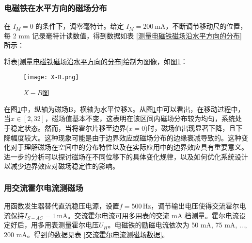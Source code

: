 \documentclass[11pt]{article}
\begin{document}
	
	\subsubsection{电磁铁在水平方向的磁场分布}
	
	在 $I_M = 0$ 的条件下，调零毫特计。给定 $I_M = 200 \ \mathrm{mA}$，不断调节移动尺的位置，每 2 mm 记录毫特计读数值，得到数据如表 \ref{测量电磁铁磁场沿水平方向的分布} 所示：
	\begin{table}[H]\centering
		\caption{测量电磁铁磁场沿水平方向的分布}
		\label{测量电磁铁磁场沿水平方向的分布}
	\end{table}
	
	将表\ref{测量电磁铁磁场沿水平方向的分布}绘制为图像，如图\ref{fig:X-B}：
	\begin{figure}[H]
		\centering
		\texttt{[image: X-B.png]}
		\caption{$X-B$图}
		\label{fig:X-B}
	\end{figure}
	
	在图\ref{fig:X-B}中，纵轴为磁场B，横轴为水平位移X。从图\ref{fig:X-B}中可以看出，在移动过程中，当$x \in [2, 32]$，磁场值基本不变，这表明在该区间内磁场分布较为均匀，系统处于稳定状态。然而，当将霍尔片移至边界($x=0$)时，磁场值出现显著下降，且下降幅度较大。这种现象可能是由于边界效应或磁场分布的边缘衰减导致的。这种变化对于理解磁场在空间中的分布特性以及在实际应用中的边界效应具有重要意义。进一步的分析可以探讨磁场在不同位移下的具体变化规律，以及如何优化系统设计以减少边界效应对磁场稳定性的影响。
	
	\subsubsection{用交流霍尔电流测磁场}
	用函数发生器替代直流稳压电源，设置$ f=500\,\mathrm{Hz} $，调节输出电压使得交流霍尔电流保持$ I_{S-AC}= 1\,\mathrm{mA} $。交流霍尔电流可用多用表的交流 mA 档测量。霍尔电流设定好后，用多用表测量霍尔电压$ U_H $。电磁铁的励磁电流依次为 50 mA, 75 mA, ..., 200 mA。得到的数据见表 \ref{交流霍尔电流测磁场数据}。
	
\end{document}
